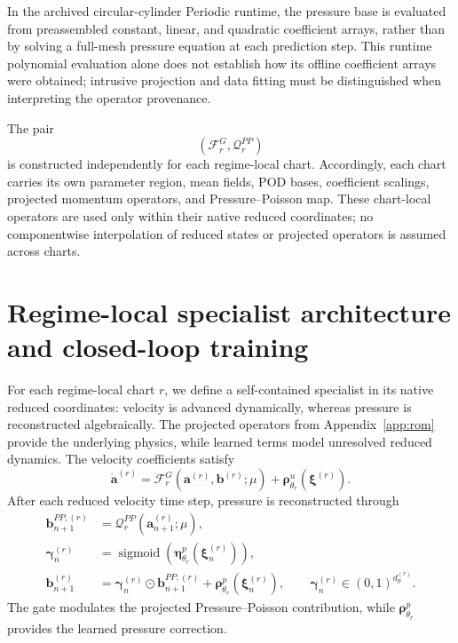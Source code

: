 \documentclass{article}
\providecommand{\DIFaddtex}[1]{{\protect\color{blue} \sf #1}} %
\providecommand{\DIFaddbegin}{} %
\providecommand{\DIFaddend}{} %
\providecommand{\DIFadd}[1]{\texorpdfstring{\DIFaddtex{#1}}{#1}} %
\providecommand{\DIFaddincludegraphics}[2][]{{\color{blue}\fbox{\DIFOincludegraphics[#1]{#2}}}} %
\DeclareRobustCommand{\DIFaddbegin}{\DIFOaddbegin \let\includegraphics\DIFaddincludegraphics} %
\DeclareRobustCommand{\DIFaddend}{\DIFOaddend \let\includegraphics\DIFOincludegraphics} %
\begin{document}
\DIFaddbegin \DIFadd{In the archived circular-cylinder Periodic runtime, the pressure base is evaluated from preassembled constant, linear, and quadratic coefficient arrays, rather than by solving a full-mesh pressure equation at each prediction step. This runtime polynomial evaluation alone does not establish how its offline coefficient arrays were obtained; intrusive projection and data fitting must be distinguished when interpreting the operator provenance.
}

\DIFaddend The pair
\begin{equation}
    \left(
        \mathcal F_r^G,
        \mathcal Q_r^{PP}
    \right)
\end{equation}
is constructed independently for each regime-local chart.
Accordingly, each chart carries its own parameter region, mean fields,
POD bases, coefficient scalings, projected momentum operators, and
Pressure--Poisson map.
These chart-local operators are used only within their native reduced
coordinates; no componentwise interpolation of reduced states or projected
operators is assumed across charts.


\section{Regime-local specialist architecture and closed-loop training}
\label{app:specialists}

For each regime-local chart $r$, we define a self-contained 
specialist in its native reduced coordinates: velocity is advanced
dynamically, whereas pressure is reconstructed algebraically.
The projected operators from Appendix~\ref{app:rom} provide the underlying physics, while learned terms model unresolved reduced dynamics. The velocity coefficients satisfy
\begin{equation}
  \dot{\bm a}^{(r)}
  =
  \mathcal F_r^G
  \left(
    \bm a^{(r)},\bm b^{(r)};\mu
  \right)
  +
  \bm\rho^u_{\theta_r}
  \left(
    \bm\xi^{(r)}
  \right).
  \label{eq:app_hybrid_velocity_rhs}
\end{equation}
After each reduced velocity time step, pressure is reconstructed through
\begin{align}
  \bm b_{n+1}^{PP,(r)}
  &=
  \mathcal Q_r^{PP}
  \left(
    \bm a_{n+1}^{(r)};\mu
  \right),
  \nonumber\\
  \bm\gamma_n^{(r)}
  &=
  \operatorname{sigmoid}
  \left(
    \bm\eta^p_{\theta_r}
    (\bm\xi_n^{(r)})
  \right),
  \nonumber\\
  \bm b_{n+1}^{(r)}
  &=
  \bm\gamma_n^{(r)}
  \odot
  \bm b_{n+1}^{PP,(r)}
  +
  \bm\rho^p_{\theta_r}
  (\bm\xi_n^{(r)}),
  \qquad
  \bm\gamma_n^{(r)}
  \in(0,1)^{d_p^{(r)}}.
  \label{eq:app_pressure_closure}
\end{align}
The gate modulates the projected Pressure--Poisson contribution, while
$\bm\rho^p_{\theta_r}$ provides the learned pressure correction.
\end{document}
